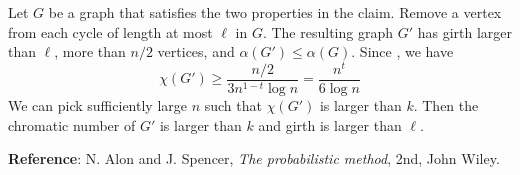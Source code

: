 \documentclass[12pt]{article}
\begin{document}
\bigskip

 Let $G$ be a graph that satisfies the two properties in the
claim. Remove a vertex from each cycle of length at most $\ell$ in
$G$. The resulting graph $G'$ has girth larger than $\ell$, more
than $n/2$ vertices, and $\alpha(G')\leq \alpha(G)$. Since
, we have
\[
  \chi(G') \geq \frac{n/2}{3n^{1-t}\log n} = \frac{n^t}{6 \log n}
\]
We can pick sufficiently large $n$ such that $\chi(G')$ is larger
than $k$. Then the chromatic number of $G'$ is larger than $k$ and
girth is larger than $\ell$.


{\bf Reference}: N. Alon and J. Spencer, {\it The probabilistic method}, 2nd, John Wiley.
\end{document}
